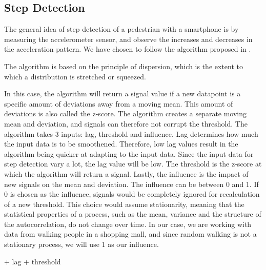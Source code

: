 

\subsection{Step Detection}

The general idea of step detection of a pedestrian with a smartphone is by measuring the accelerometer sensor, and observe the increases and decreases in the acceleration pattern\cite{HybridPositioningPaper}. We have chosen to follow the algorithm proposed in \cite{peakdetection}. 

The algorithm is based on the principle of dispersion, which is the extent to which a distribution is stretched or squeezed. %

In this case, the algorithm will return a signal value if a new datapoint is a specific amount of deviations away from a moving mean. This amount of deviations is also called the z-score. The algorithm creates a separate moving mean and deviation, and signals can therefore not corrupt the threshold. The algorithm takes 3 inputs: lag, threshold and influence. Lag determines how much the input data is to be smoothened. Therefore, low lag values result in the algorithm being quicker at adapting to the input data. Since the input data for step detection vary a lot, the lag value will be low. The threshold is the z-score at which the algorithm will return a signal. Lastly, the influence is the impact of new signals on the mean and deviation. The influence can be between 0 and 1. If 0 is chosen as the influence, signals would be completely ignored for recalculation of a new threshold. This choice would assume stationarity, meaning that the statistical properties of a process, such as the mean, variance and the structure of the autocorrelation, do not change over time. In our case, we are working with data from walking people in a shopping mall, and since random walking is not a stationary process, we will use 1 as our influence. 

+ lag 
+ threshold





%

